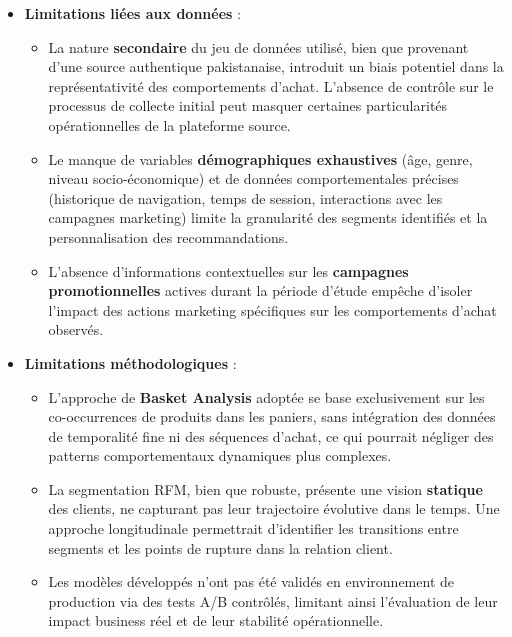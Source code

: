 \documentclass[a4paper,12pt]{article}
\begin{document}
\begin{itemize}

    \item \textbf{Limitations liées aux données} :
    \begin{itemize}
        \item La nature \textbf{secondaire} du jeu de données utilisé, bien que provenant d'une source authentique pakistanaise, introduit un biais potentiel dans la représentativité des comportements d'achat. L'absence de contrôle sur le processus de collecte initial peut masquer certaines particularités opérationnelles de la plateforme source.
        
        \item Le manque de variables \textbf{démographiques exhaustives} (âge, genre, niveau socio-économique) et de données comportementales précises (historique de navigation, temps de session, interactions avec les campagnes marketing) limite la granularité des segments identifiés et la personnalisation des recommandations.
        
        \item L'absence d'informations contextuelles sur les \textbf{campagnes promotionnelles} actives durant la période d'étude empêche d'isoler l'impact des actions marketing spécifiques sur les comportements d'achat observés.
    \end{itemize}
    
    \item \textbf{Limitations méthodologiques} :
    \begin{itemize}
        \item L'approche de \textbf{Basket Analysis} adoptée se base exclusivement sur les co-occurrences de produits dans les paniers, sans intégration des données de temporalité fine ni des séquences d'achat, ce qui pourrait négliger des patterns comportementaux dynamiques plus complexes.
        
        \item La segmentation RFM, bien que robuste, présente une vision \textbf{statique} des clients, ne capturant pas leur trajectoire évolutive dans le temps. Une approche longitudinale permettrait d'identifier les transitions entre segments et les points de rupture dans la relation client.
        
        \item Les modèles développés n'ont pas été validés en environnement de production via des tests A/B contrôlés, limitant ainsi l'évaluation de leur impact business réel et de leur stabilité opérationnelle.
    \end{itemize}
    

\end{itemize}
\end{document}
